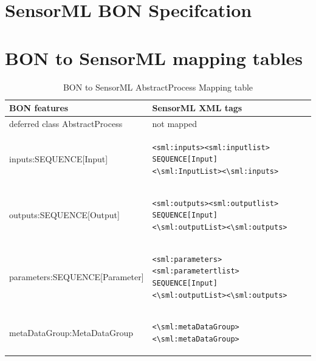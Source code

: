\documentclass[]{final_report}
\begin{document}
\section {SensorML BON Specifcation}\label{appenBSMLBONSpec}

\lstset{basicstyle=\scriptsize,showspaces=false,showstringspaces=false}

\section {BON to SensorML mapping tables} \label{appenBSMLBONTables}
\lstset{frame=none}
\begin{table}[!th]
\centering
\begin{tabular}{|l|l|}
\hline
BON features & SensorML XML tags\\
\hline
   deferred class AbstractProcess  & not mapped\\
\hline     
     inputs:SEQUENCE[Input] & \begin{lstlisting}
<sml:inputs><sml:inputlist>
SEQUENCE[Input]
<\sml:InputList><\sml:inputs>\end{lstlisting}\\

\hline 
     outputs:SEQUENCE[Output] & \begin{lstlisting}
<sml:outputs><sml:outputlist>
SEQUENCE[Input]
<\sml:outputList><\sml:outputs>\end{lstlisting}\\
\hline
     parameters:SEQUENCE[Parameter] & \begin{lstlisting}
<sml:parameters><sml:parametertlist>
SEQUENCE[Input]
<\sml:outputList><\sml:outputs>\end{lstlisting}\\

\hline                 
     metaDataGroup:MetaDataGroup &  \begin{lstlisting}
<\sml:metaDataGroup><\sml:metaDataGroup>\end{lstlisting}\\
 \hline    

\end{tabular}
\caption{BON to SensorML AbstractProcess Mapping table}\label{table:bon_sml_example}
\label{ex:table}
\end{table}
\label{endpage}
\end{document}

